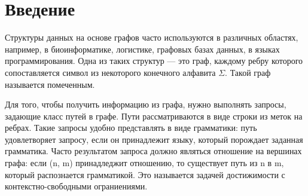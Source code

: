 \documentclass[14pt]{matmex-diploma}
\theoremstyle{definition}
\begin{document}
\maketitle
\tableofcontents
\section*{Введение}
    Структуры данных на основе графов часто используются в различных областях, например, в биоинформатике, логистике, графовых базах данных, в языках программирования. Одна из таких структур --- это граф, каждому ребру которого сопоставляется символ из некоторого конечного алфавита $\Sigma$. Такой граф называется помеченным.
    
    Для того, чтобы получить информацию из графа, нужно выполнять запросы, задающие класс путей в графе. Пути рассматриваются в виде строки из меток на ребрах. Такие запросы удобно представлять в виде грамматики: путь удовлетворяет запросу, если он принадлежит языку, который порождает заданная грамматика. Часто результатом запроса должно являться отношение на вершинах графа: если (n, m) принадледжит отношению, то существует путь из n в m, который распознается грамматикой. Это называется задачей достижимости с контекстно-свободными ограниениями.
    
\end{document}
